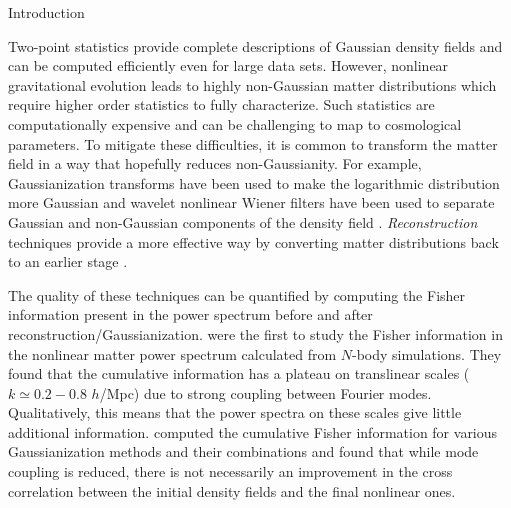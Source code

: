 \begin{section}{Introduction}\label{sec:introduction}  

  Two-point statistics provide complete descriptions of Gaussian
  density fields and can be computed efficiently even for large data
  sets.  However, nonlinear gravitational evolution leads to highly
  non-Gaussian matter distributions which require higher order
  statistics to fully characterize.  Such statistics are
  computationally expensive and can be challenging to map to
  cosmological parameters.  To mitigate these difficulties, it is
  common to transform the matter field in a way that hopefully reduces
  non-Gaussianity.  For example, Gaussianization transforms have been
  used to make the logarithmic distribution more Gaussian
  \cite{bib:Weinberg1992,bib:Mark2009} and wavelet nonlinear Wiener
  filters have been used to separate Gaussian and non-Gaussian
  components of the density field
  \cite{bib:Zhang2011,bib:Yu2012,bib:HarnoisD2013}.
  {\it Reconstruction} techniques \citep{bib:Daniel2007} provide a more
  effective way by converting matter distributions back to an
  earlier stage \citep{bib:HarnoisD2013}.

  The quality of these techniques can be quantified by computing the Fisher
  information \citep{bib:Rimes2006} present in the power spectrum before and after
  reconstruction/Gaussianization.
  \citet{bib:Rimes2006} were the first to study the Fisher information in the nonlinear
  matter power spectrum calculated from $N$-body simulations.  They
  found that the cumulative information has a plateau on translinear scales
  ($k \simeq 0.2-0.8$ $h$/Mpc) due to strong coupling between Fourier
  modes.  Qualitatively, this means that the power spectra on these
  scales give little additional information.  
  \citet{bib:HarnoisD2013} computed the cumulative Fisher information
  for various Gaussianization methods and their combinations
  and found that while mode coupling is reduced, there is not
  necessarily an improvement in the cross correlation between the
  initial density fields and the final nonlinear ones. 


\end{section}
